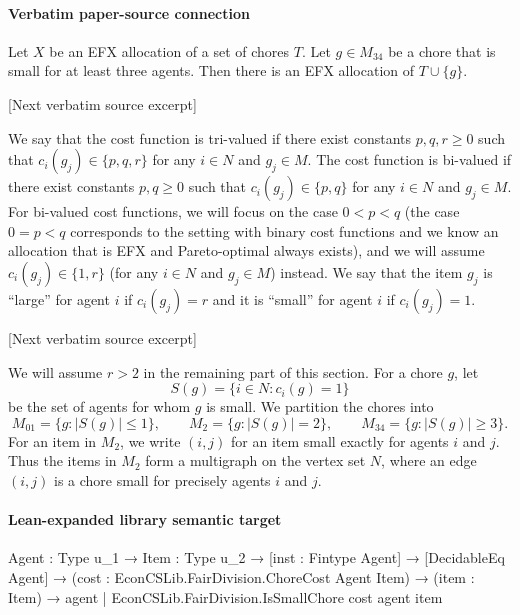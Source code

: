 \documentclass[10pt]{article}
\begin{document}
\paragraph{Verbatim paper-source connection}
\begin{ReviewVerbatim}
\begin{lemma}\label{lem:insertion}
Let $X$ be an EFX allocation of a set of chores $T$.  Let $g\in M_{34}$ be a
chore that is small for at least three agents.  Then there is an EFX
allocation of $T\cup\{g\}$.
\end{lemma}

[Next verbatim source excerpt]

We say that the cost function is tri-valued if there exist constants $p,q,r\geq 0$ such that $c_i(g_j)\in\{p,q,r\}$ for any $i\in N$ and $g_j\in M$.
The cost function is bi-valued if there exist constants $p,q\geq 0$ such that $c_i(g_j)\in\{p,q\}$ for any $i\in N$ and $g_j\in M$.
For bi-valued cost functions, we will focus on the case $0<p<q$ (the case $0=p<q$ corresponds to the setting with binary cost functions and we know an allocation that is EFX and Pareto-optimal always exists), and we will assume $c_i(g_j)\in\{1,r\}$ (for any $i\in N$ and $g_j\in M$) instead.
We say that the item $g_j$ is ``large'' for agent $i$ if $c_i(g_j)=r$ and it is ``small'' for agent $i$ if $c_i(g_j)=1$.

[Next verbatim source excerpt]

We will assume $r>2$ in the remaining part of this section.
For a chore $g$, let
\[
 S(g)=\{i\in N:c_i(g)=1\}
\]
be the set of agents for whom $g$ is small.  We partition the chores into
\[
M_{01}=\{g:|S(g)|\le 1\},\qquad
M_2=\{g:|S(g)|=2\},\qquad
M_{34}=\{g:|S(g)|\ge 3\}.
\]
For an item in $M_2$, we write $(i,j)$ for an item small exactly for agents
$i$ and $j$.  Thus the items in $M_2$ form a multigraph on the vertex set
$N$, where an edge $(i,j)$ is a chore small for precisely agents $i$ and $j$.
\end{ReviewVerbatim}

\paragraph{Lean-expanded library semantic target}
\begin{ReviewVerbatim}
{Agent : Type u_1} →
  {Item : Type u_2} →
    [inst : Fintype Agent] →
      [DecidableEq Agent] →
        (cost : EconCSLib.FairDivision.ChoreCost Agent Item) →
          (item : Item) → {agent | EconCSLib.FairDivision.IsSmallChore cost agent item}
\end{ReviewVerbatim}
\end{document}
